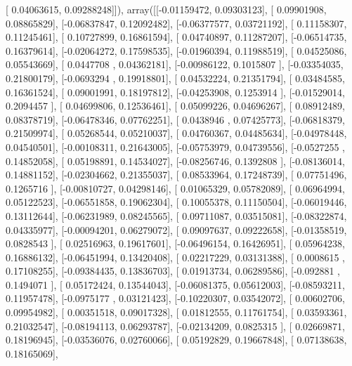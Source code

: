 \documentclass{article}
\begin{document}
       [ 0.04063615,  0.09288248]]), array([[-0.01159472,  0.09303123],
       [ 0.09901908,  0.08865829],
       [-0.06837847,  0.12092482],
       [-0.06377577,  0.03721192],
       [ 0.11158307,  0.11245461],
       [ 0.10727899,  0.16861594],
       [ 0.04740897,  0.11287207],
       [-0.06514735,  0.16379614],
       [-0.02064272,  0.17598535],
       [-0.01960394,  0.11988519],
       [ 0.04525086,  0.05543669],
       [ 0.0447708 ,  0.04362181],
       [-0.00986122,  0.1015807 ],
       [-0.03354035,  0.21800179],
       [-0.0693294 ,  0.19918801],
       [ 0.04532224,  0.21351794],
       [ 0.03484585,  0.16361524],
       [ 0.09001991,  0.18197812],
       [-0.04253908,  0.1253914 ],
       [-0.01529014,  0.2094457 ],
       [ 0.04699806,  0.12536461],
       [ 0.05099226,  0.04696267],
       [ 0.08912489,  0.08378719],
       [-0.06478346,  0.07762251],
       [ 0.0438946 ,  0.07425773],
       [-0.06818379,  0.21509974],
       [ 0.05268544,  0.05210037],
       [ 0.04760367,  0.04485634],
       [-0.04978448,  0.04540501],
       [-0.00108311,  0.21643005],
       [-0.05753979,  0.04739556],
       [-0.0527255 ,  0.14852058],
       [ 0.05198891,  0.14534027],
       [-0.08256746,  0.1392808 ],
       [-0.08136014,  0.14881152],
       [-0.02304662,  0.21355037],
       [ 0.08533964,  0.17248739],
       [ 0.07751496,  0.1265716 ],
       [-0.00810727,  0.04298146],
       [ 0.01065329,  0.05782089],
       [ 0.06964994,  0.05122523],
       [-0.06551858,  0.19062304],
       [ 0.10055378,  0.11150504],
       [-0.06019446,  0.13112644],
       [-0.06231989,  0.08245565],
       [ 0.09711087,  0.03515081],
       [-0.08322874,  0.04335977],
       [-0.00094201,  0.06279072],
       [ 0.09097637,  0.09222658],
       [-0.01358519,  0.0828543 ],
       [ 0.02516963,  0.19617601],
       [-0.06496154,  0.16426951],
       [ 0.05964238,  0.16886132],
       [-0.06451994,  0.13420408],
       [ 0.02217229,  0.03131388],
       [ 0.0008615 ,  0.17108255],
       [-0.09384435,  0.13836703],
       [ 0.01913734,  0.06289586],
       [-0.092881  ,  0.1494071 ],
       [ 0.05172424,  0.13544043],
       [-0.06081375,  0.05612003],
       [-0.08593211,  0.11957478],
       [-0.0975177 ,  0.03121423],
       [-0.10220307,  0.03542072],
       [ 0.00602706,  0.09954982],
       [ 0.00351518,  0.09017328],
       [ 0.01812555,  0.11761754],
       [ 0.03593361,  0.21032547],
       [-0.08194113,  0.06293787],
       [-0.02134209,  0.0825315 ],
       [ 0.02669871,  0.18196945],
       [-0.03536076,  0.02760066],
       [ 0.05192829,  0.19667848],
       [ 0.07138638,  0.18165069],
\end{document}
